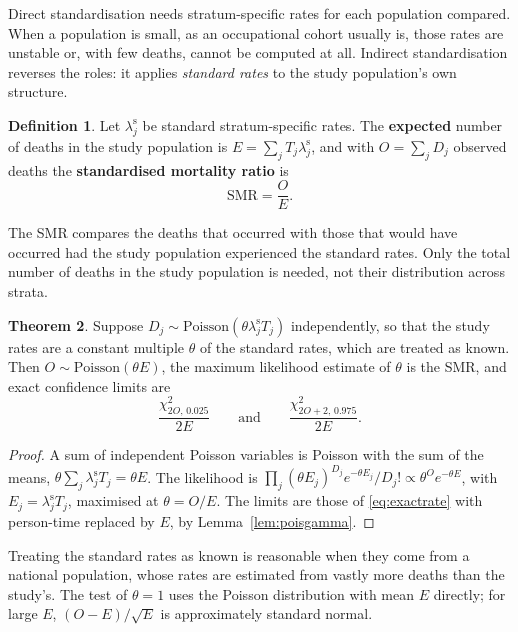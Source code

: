 \documentclass[11pt,a4paper]{article}
\numberwithin{equation}{section}
\theoremstyle{definition}
\newtheorem{thm}{Theorem}[subsection]
\newtheorem{defn}[thm]{Definition}
\begin{document}
Direct standardisation needs stratum-specific rates for each population compared. When a population is small, as an occupational
cohort usually is, those rates are unstable or, with few deaths, cannot be computed at all. Indirect standardisation reverses the roles:
it applies \emph{standard rates} to the study population's own structure.

\begin{defn}
Let $\lambda_j^{\text{s}}$ be standard stratum-specific rates. The \textbf{expected} number of deaths in the study population is $E = \sum_j T_j \lambda^{\text{s}}_j$, and with
$O = \sum_j D_j$ observed deaths the \textbf{standardised mortality ratio} is
\[
\text{SMR} = \frac{O}{E} .
\]
\end{defn}

The SMR compares the deaths that occurred with those that would have occurred had the study population experienced the standard rates.
Only the total number of deaths in the study population is needed, not their distribution across strata.

\begin{thm}
\label{thm:smr}
Suppose $D_j \sim \text{Poisson}(\theta\lambda^{\text{s}}_j T_j)$ independently, so that the study rates are a constant multiple $\theta$ of the standard rates, which are
treated as known. Then $O \sim \text{Poisson}(\theta E)$, the maximum likelihood estimate of $\theta$ is the SMR, and exact confidence limits are
\[
\frac{\chi^2_{2O,\,0.025}}{2E} \qquad\text{and}\qquad \frac{\chi^2_{2O + 2,\,0.975}}{2E} .
\]
\end{thm}

\begin{proof}
A sum of independent Poisson variables is Poisson with the sum of the means, $\theta\sum_j\lambda^{\text{s}}_j T_j = \theta E$. The likelihood is
$\prod_j(\theta E_j)^{D_j}e^{-\theta E_j}/D_j! \propto \theta^O e^{-\theta E}$, with $E_j = \lambda^{\text{s}}_j T_j$, maximised at $\theta = O/E$. The limits are those of \eqref{eq:exactrate} with
person-time replaced by $E$, by Lemma~\ref{lem:poisgamma}.
\end{proof}

Treating the standard rates as known is reasonable when they come from a national population, whose rates are estimated from vastly
more deaths than the study's. The test of $\theta = 1$ uses the Poisson distribution with mean $E$ directly; for large $E$, $(O - E)/\sqrt{E}$ is
approximately standard normal.
\end{document}
